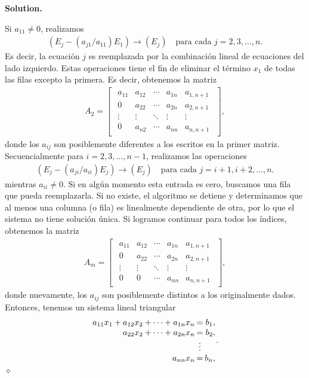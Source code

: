 \documentclass{article}
\theoremstyle{problemstyle}
\newenvironment{solution}{%
  \begin{mdframed}[linewidth=0.8pt,linecolor=Gray,backgroundcolor=Gray!5,roundcorner=5pt]%
  \noindent\textbf{Solution.}%
}{%
\hfill $ \diamond $ 
  \end{mdframed}%
}
\begin{document}
\begin{solution}
	Si $ a_{11} \neq 0 $, realizamos
	\begin{align*}
		(E_j - (a_{j1}/a_{11})E_1) \to (E_j)\quad \text{para cada } j = 2,3,\dots,n.
	\end{align*}
	Es decir, la ecuaci\'on $ j $ es reemplazada por la combinaci\'on lineal de ecuaciones del lado izquierdo.
	Estas operaciones tiene el fin de eliminar el t\'ermino $ x_1 $ de todas las filas excepto la primera. Es decir, obtenemos la matriz
	\begin{align*} A_2 =
		\begin{bmatrix}
			\begin{array}{cccc|c}
				a_{11} & a_{12} & \cdots & a_{1n} & a_{1,n+1} \\
				0      & a_{22} & \cdots & a_{2n} & a_{2,n+1} \\
				\vdots & \vdots & \ddots & \vdots & \vdots    \\
				0      & a_{n2} & \cdots & a_{nn} & a_{n,n+1}
			\end{array}
		\end{bmatrix},
	\end{align*}
	donde los $ a_{ij} $ son posiblemente diferentes a los escritos en la primer matriz. Secuencialmente para $ i = 2,3,\dots, n-1 $, realizamos las operaciones
	\begin{align*}
		(E_j - (a_{ji}/a_{ii})E_j) \to (E_j)\quad \text{para cada } j = i+1, i+2,\dots, n.
	\end{align*}
	mientras $ a_{ii}\neq 0 $. Si en alg\'un momento esta entrada es cero, buscamos una fila que pueda reemplazarla. Si no existe, el algoritmo se detiene y determinamos que al menos una columna (o fila) es linealmente dependiente de otra, por lo que el sistema no tiene soluci\'on \'unica. Si logramos continuar para todos los \'indices, obtenemos la matriz
	\begin{align*} A_m =
		\begin{bmatrix}
			\begin{array}{cccc|c}
				a_{11} & a_{12} & \cdots & a_{1n} & a_{1,n+1} \\
				0      & a_{22} & \cdots & a_{2n} & a_{2,n+1} \\
				\vdots & \vdots & \ddots & \vdots & \vdots    \\
				0      & 0      & \cdots & a_{nn} & a_{n,n+1}
			\end{array}
		\end{bmatrix},
	\end{align*}
	donde nuevamente, los $ a_{ij} $ son posiblemente distintos a los originalmente dados. Entonces, tenemos un sistema lineal triangular
	\begin{align*}
		\arraycolsep=1pt
		\begin{array}{rcr}
			a_{11}x_{1} + a_{12}x_{2} + \cdots + a_{1n}x_{n} & =      & b_{1}, \\
			a_{22}x_{2} + \cdots + a_{2n}x_{n}               & =      & b_{2}, \\
			                                                 & \vdots &        \\
			a_{nn}x_{n}                                      & =      & b_{n},
		\end{array}.
	\end{align*}
\end{solution}
\end{document}
